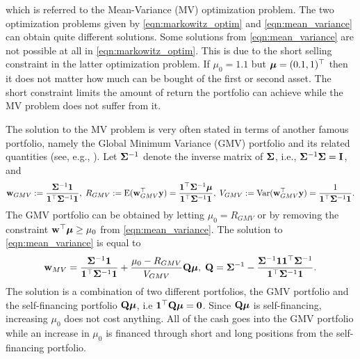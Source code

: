 \documentclass[12pt, oneside]{book}\usepackage{knitr}
\begin{document}
which is referred to the Mean-Variance (MV) optimization problem. 
The two optimization problems given by \eqref{eqn:markowitz_optim} and \eqref{eqn:mean_variance} can obtain quite different solutions. 
Some solutions from \eqref{eqn:mean_variance} are not possible at all in \eqref{eqn:markowitz_optim}.
This is due to the short selling constraint in the latter optimization problem.
If $\mu_0=1.1$ but $\mbox{\boldmath$\mu$}= (0.1, 1)^\top$ then it does not matter how much can be bought of the first or second asset.
The short constraint limits the amount of return the portfolio can achieve while the MV problem does not suffer from it.

The solution to the MV problem is very often stated in terms of another famous portfolio, namely the Global Minimum Variance (GMV) portfolio and its related quantities (see, e.g., \citet{Bodnar2009CaIotEFiEM}). 
Let $\mathbf{\Sigma}^{-1}$ denote the inverse matrix of $\mathbf{\Sigma}$, i.e., $\mathbf{\Sigma}^{-1}\mathbf{\Sigma} = \mathbf{I}$, and
\begin{equation}\label{eqn:GMV}
	\mathbf{w}_{GMV} := \frac{\mathbf{\Sigma}^{-1}\mathbf{1}}{\mathbf{1}^\top \mathbf{\Sigma}^{-1}\mathbf{1}}, \; R_{GMV} :=\operatorname{E}(\mathbf{w}_{GMV}^\top\mathbf{y}) = \frac{\mathbf{1}^\top\mathbf{\Sigma}^{-1}\mbox{\boldmath$\mu$}}{\mathbf{1}^\top \mathbf{\Sigma}^{-1}\mathbf{1}}, \;
	V_{GMV} := \operatorname{Var}(\mathbf{w}_{GMV}^\top\mathbf{y}) =\frac{1}{\mathbf{1}^\top \mathbf{\Sigma}^{-1}\mathbf{1}}.
\end{equation}
The GMV portfolio can be obtained by letting $\mu_0=R_{GMV}$ or by removing the constraint $\mathbf{w}^\top \mbox{\boldmath$\mu$} \geq \mu_0$ from \eqref{eqn:mean_variance}. 
The solution to \eqref{eqn:mean_variance} is equal to
\begin{equation}\label{eqn:mean_var_solution}
	\mathbf{w}_{MV} = \frac{\mathbf{\Sigma}^{-1}\mathbf{1}}{\mathbf{1}^\top \mathbf{\Sigma}^{-1}\mathbf{1}} + \frac{\mu_0 - R_{GMV}}{V_{GMV}} \mathbf{Q} \mbox{\boldmath$\mu$},\; \mathbf{Q} = \mathbf{\Sigma}^{-1} - \frac{\mathbf{\Sigma}^{-1} \mathbf{1} \mathbf{1}^\top \mathbf{\Sigma}^{-1}}{\mathbf{1}^\top \mathbf{\Sigma}^{-1} \mathbf{1}}.
\end{equation}
The solution is a combination of two different portfolios, the GMV portfolio and the self-financing portfolio $\mathbf{Q} \mbox{\boldmath$\mu$}$, i.e $\mathbf{1}^\top \mathbf{Q} \mbox{\boldmath$\mu$} = \mathbf{0}$. 
Since $\mathbf{Q} \mbox{\boldmath$\mu$}$ is self-financing, increasing $\mu_0$ does not cost anything.
All of the cash goes into the GMV portfolio while an increase in $\mu_0$ is financed through short and long positions from the self-financing portfolio.
\end{document}
